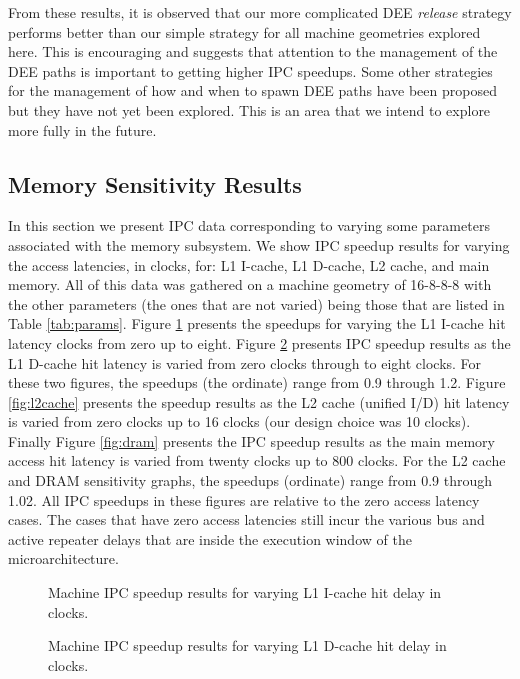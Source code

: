 \documentclass[10pt,dvips]{article}
\begin{document}
%
From these results, 
it is observed that our more complicated DEE \textit{release} strategy
performs better than our simple strategy for all machine
geometries explored here.
This is encouraging and suggests that attention to the
management of the DEE paths is important to getting
higher IPC speedups.
Some other strategies for the management of how and when to
spawn DEE paths have been proposed but they have not yet been
explored.  
This is an area that we intend to explore more
fully in the future.
%
\subsection{Memory Sensitivity Results}
%
In this section we present IPC data corresponding to varying some
parameters associated with the memory subsystem.
We show IPC speedup results for varying the access latencies,
in clocks, for: L1 I-cache,
L1 D-cache,
L2 cache, and
main memory.
All of this data was gathered on a machine geometry 
of 16-8-8-8 with the other parameters (the ones that are
not varied) being those that are listed in Table \ref{tab:params}.
Figure \ref{fig:l1icache} presents the speedups for varying
the L1 I-cache hit latency clocks from zero up to eight.
Figure \ref{fig:l1dcache} presents IPC speedup results
as the L1 D-cache hit latency is varied from zero clocks through to
eight clocks.
For these two figures, the speedups (the ordinate)
range from 0.9 through 1.2.
Figure \ref{fig:l2cache} presents the speedup results
as the L2 cache (unified I/D) hit latency is varied from 
zero clocks up to 16 clocks (our design choice was 10 clocks).
Finally Figure \ref{fig:dram} presents the IPC speedup results
as the main memory access hit latency is varied from twenty clocks 
up to 800 clocks.
For the L2 cache and DRAM sensitivity graphs, the speedups
(ordinate) range from 0.9 through 1.02.
All IPC speedups in these figures are relative to the zero
access latency cases.  The cases that have zero access latencies
still incur the various bus and active repeater delays that
are inside the execution window of the microarchitecture.
%
\begin{figure}
\centering
{}
\caption{Machine IPC speedup results for varying 
L1 I-cache hit delay in clocks.}
\label{fig:l1icache}
\end{figure}
%
\begin{figure}
\centering
{}
\caption{Machine IPC speedup results for varying 
L1 D-cache hit delay in clocks.}
\label{fig:l1dcache}
\end{figure}
\end{document}
